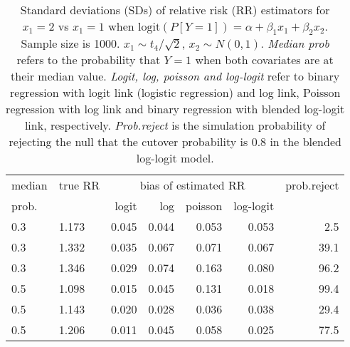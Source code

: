 \documentclass[12pt,a4paper]{article}
\begin{document}
\begin{table}[H] 
\small\sf\centering 
\caption{Standard deviations (SDs) of relative risk (RR) estimators for $x_1=2$ vs $x_1=1$ when $\mbox{logit}(P[Y=1])=\alpha+\beta_1 x_1 + \beta_2 x_2$. Sample size is 1000. $x_1 \sim $$t_4/\sqrt{2}$, $x_2 \sim N(0,1)$. {\it Median prob} refers to the probability that $Y=1$ when both covariates are at their median value. {\it Logit, log, poisson and log-logit} refer to binary regression with logit link (logistic regression) and log link, Poisson regression with log link and binary regression with blended log-logit link, respectively. {\it Prob.reject} is the simulation probability of rejecting the null that the cutover probability is $0.8$ in the blended log-logit model.} 
\begin{tabular}{llrrrrr} 
\toprule 
median & true RR & \multicolumn{4}{c}{bias of estimated RR} & prob.reject \\ 
prob. & & logit & log & poisson & log-logit  & \\ \midrule 
0.3 & 1.173 & 0.045 & 0.044 & 0.053 & 0.053 &  2.5 \\  
0.3 & 1.332 & 0.035 & 0.067 & 0.071 & 0.067 & 39.1 \\  
0.3 & 1.346 & 0.029 & 0.074 & 0.163 & 0.080 & 96.2 \\  
0.5 & 1.098 & 0.015 & 0.045 & 0.131 & 0.018 & 99.4 \\  
0.5 & 1.143 & 0.020 & 0.028 & 0.036 & 0.038 & 29.4 \\  
0.5 & 1.206 & 0.011 & 0.045 & 0.058 & 0.025 & 77.5 \\  
\bottomrule 
\end{tabular} 
\end{table} 
\end{document}
